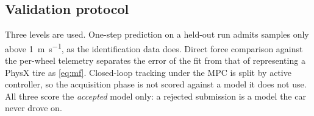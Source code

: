 \subsection{Validation protocol}
\label{subsec:validation}

Three levels are used. One-step prediction on a held-out run admits samples
only above \SI{1}{\meter\per\second}, as the identification data does. Direct
force comparison against the per-wheel telemetry separates the error of the fit
from that of representing a PhysX tire as \eqref{eq:mf}. Closed-loop tracking
under the MPC is split by active controller, so the acquisition phase is not
scored against a model it does not use. All three score the
\emph{accepted} model only: a rejected submission is a model the car never
drove on.
